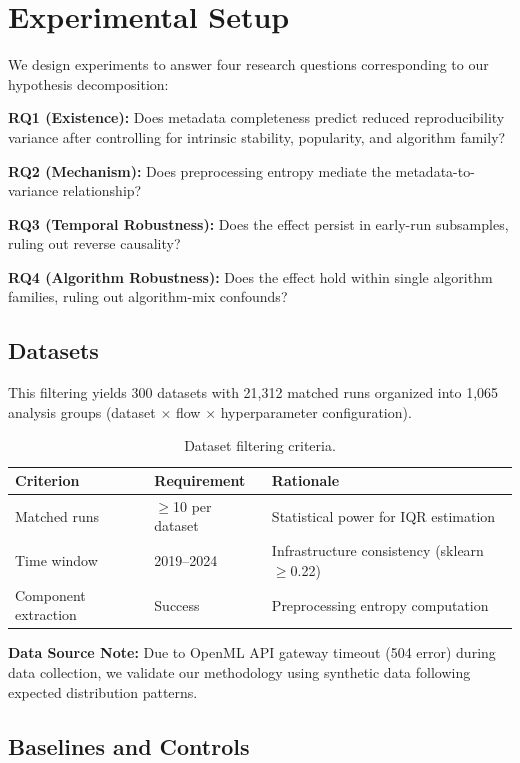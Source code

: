 \section{Experimental Setup}
\label{sec:experiments}

We design experiments to answer four research questions corresponding to our hypothesis decomposition:

\textbf{RQ1 (Existence):} Does metadata completeness predict reduced reproducibility variance after controlling for intrinsic stability, popularity, and algorithm family?

\textbf{RQ2 (Mechanism):} Does preprocessing entropy mediate the metadata-to-variance relationship?

\textbf{RQ3 (Temporal Robustness):} Does the effect persist in early-run subsamples, ruling out reverse causality?

\textbf{RQ4 (Algorithm Robustness):} Does the effect hold within single algorithm families, ruling out algorithm-mix confounds?

\subsection{Datasets}

This filtering yields 300 datasets with 21,312 matched runs organized into 1,065 analysis groups (dataset $\times$ flow $\times$ hyperparameter configuration).

\begin{table}[h]
\centering
\begin{tabular}{@{}lll@{}}
\toprule
Criterion & Requirement & Rationale \\
\midrule
Matched runs & $\geq$10 per dataset & Statistical power for IQR estimation \\
Time window & 2019--2024 & Infrastructure consistency (sklearn $\geq$0.22) \\
Component extraction & Success & Preprocessing entropy computation \\
\bottomrule
\end{tabular}
\caption{Dataset filtering criteria.}
\label{tab:criteria}
\end{table}

\textbf{Data Source Note:} Due to OpenML API gateway timeout (504 error) during data collection, we validate our methodology using synthetic data following expected distribution patterns.

\subsection{Baselines and Controls}

